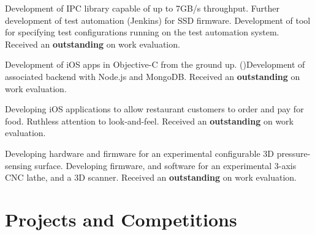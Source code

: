 \documentclass[11pt,a4paper]{moderncv}
\begin{document}
{Development of IPC library capable of up to 7GB/s throughput.
    \newline{}Further development of test automation (Jenkins) for SSD firmware.
    \newline{}Development of tool for specifying test configurations running on the test automation system.
\newline{}Received an \textbf{outstanding} on work evaluation.}

{Development of iOS apps in Objective-C from the ground up.
 \newline()Development of associated backend with Node.js and MongoDB.
\newline{}Received an \textbf{outstanding} on work evaluation.}

{Developing iOS applications to allow restaurant customers to order and pay for food.
\newline{} Ruthless attention to look-and-feel.
\newline{}Received an \textbf{outstanding} on work evaluation.}


{Developing hardware and firmware for an experimental configurable 3D pressure-sensing surface.
    \newline{}Developing firmware, and software for an experimental 3-axis CNC lathe, and a 3D scanner.
\newline{}Received an \textbf{outstanding} on work evaluation.}

\section{Projects and Competitions}
\end{document}
